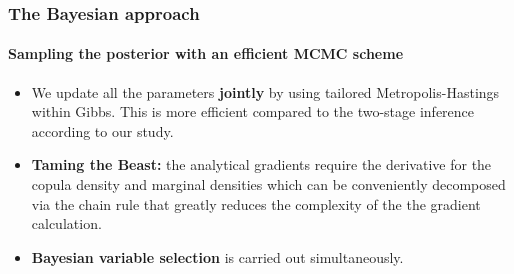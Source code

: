 \documentclass[10pt,aspectratio=169]{beamer}
\begin{document}
\begin{frame}%
  \frametitle{The Bayesian approach}
  \framesubtitle{Sampling the posterior with an efficient MCMC scheme}
  \begin{itemize}
  \item We update all the parameters \textbf{jointly} by using tailored
    Metropolis-Hastings within Gibbs. This is more efficient compared to the two-stage
    inference according to our study.

  \item \textbf{Taming the Beast:} the analytical gradients require the derivative for the
    copula density and marginal densities which can be conveniently decomposed via the
    chain rule that greatly reduces the complexity of the the gradient calculation.


  \item \textbf{Bayesian variable selection} is carried out simultaneously.





\end{itemize}
\end{frame}
\end{document}
